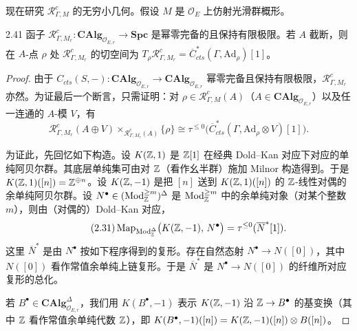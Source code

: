 现在研究 $\mathcal R^c_{\Gamma,M}$ 的无穷小几何。假设 $M$ 是 $\mathcal O_E$ 上仿射光滑群概形。

\begin{prop}{2.41}
函子 $\mathcal R^c_{\Gamma,M_r}\colon \mathbf{CAlg}_{\mathcal O_{E,r}} \to \mathbf{Spc}$ 是幂零完备的且保持有限极限。若 $A$ 截断，则在 $A$-点 $\rho$ 处 $\mathcal R^c_{\Gamma,M_r}$ 的切空间为 $T_\rho\mathcal R^c_{\Gamma,M_r} = \overline{C}^*_{cts}(\Gamma,\mathrm{Ad}_\rho)[1]$。
\label{prop:zhu2-2-41}
\end{prop}

\begin{proof}
由于 $C_{cts}(S,-)\colon \mathbf{CAlg}_{\mathcal O_{E,r}} \to \mathbf{CAlg}_{\mathcal O_{E,r}}$ 幂零完备且保持有限极限，$\mathcal R^c_{\Gamma,M_r}$ 亦然。为证最后一个断言，只需证明：对 $\rho \in \mathcal R^c_{\Gamma,M}(A)$（$A \in \mathbf{CAlg}_{\mathcal O_{E,r}}$）以及任一连通的 $A$-模 $V$，有
\begin{equation}
\tag{2.30}
\mathcal R^c_{\Gamma,M_r}(A\oplus V)\times_{\mathcal R^c_{\Gamma,M_r}(A)}\{\rho\} \cong \tau^{\le 0}\bigl(\overline{C}^*_{cts}(\Gamma,\mathrm{Ad}_\rho\otimes V)[1]\bigr).
\end{equation}

为证此，先回忆如下构造。设 $K(\mathbb{Z},1)$ 是 $\mathbb{Z}[1]$ 在经典 Dold–Kan 对应下对应的单纯阿贝尔群。其底层单纯集可由对 $\mathbb{Z}$（看作幺半群）施加 Milnor 构造得到。于是 $K(\mathbb{Z},1)([n]) = \mathbb{Z}^{\oplus n}$。设 $K(\mathbb{Z},-1)$ 是把 $[n]$ 送到 $K(\mathbb{Z},1)([n])$ 的 $\mathbb{Z}$-线性对偶的余单纯阿贝尔群。设 $N^\bullet \in (\operatorname{Mod}^{\ge m}_{\mathbb{Z}})^\Delta$ 是 $\operatorname{Mod}^{\ge m}_{\mathbb{Z}}$ 中的余单纯对象（对某个整数 $m$），则由（对偶的）Dold–Kan 对应，
\begin{equation}
\tag{2.31}
\operatorname{Map}_{\operatorname{Mod}^\Delta_{\mathbb{Z}}}\bigl(K(\mathbb{Z},-1),\, N^\bullet\bigr) = \tau^{\le 0}(\overline{N}^*[1]).
\end{equation}
这里 $\overline{N}^*$ 是由 $N^\bullet$ 按如下程序得到的复形。存在自然态射 $N^\bullet \to N([0])$，其中 $N([0])$ 看作常值余单纯上链复形。于是 $\overline{N}^*$ 是 $N^\bullet \to N([0])$ 的纤维所对应复形的总化。

若 $B^\bullet \in \mathbf{CAlg}^\Delta_{\mathcal O_{E,r}}$，我们用 $K(B^\bullet,-1)$ 表示 $K(\mathbb{Z},-1)$ 沿 $\mathbb{Z} \to B^\bullet$ 的基变换（其中 $\mathbb{Z}$ 看作常值余单纯代数 $\mathbb{Z}$），即 $K(B^\bullet,-1)([n]) = K(\mathbb{Z},-1)([n])\otimes B([n])$。


\end{proof}
